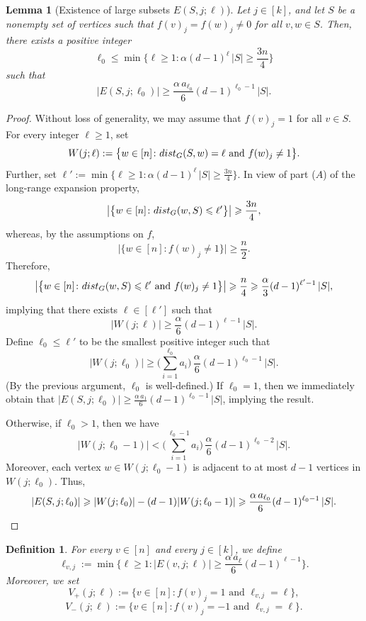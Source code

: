 \documentclass[11pt,leqno]{amsart}
\newtheorem{lemma}[theorem]{Lemma}
\newtheorem{definition}[theorem]{Definition}
\theoremstyle{remark}
\theoremstyle{plain}
\def\dist{{\rm dist}}
\def\dist{{\rm dist}}
\begin{document}
\begin{lemma}[Existence of large subsets $E(S,j;\ell)$]\label{afhbaofjhbojhb}
Let $j\in [k]$, and let $S$ be a nonempty set of vertices such that
$f(v)_j=f(w)_j\neq 0$ for all $v,w\in S$. Then, there exists a positive integer
$$\ell_0\leqslant \min\Big\{\ell\geqslant 1\colon \alpha(d-1)^\ell\,|S| \geqslant \frac{3n}{4}\Big\}$$
such that
$$ |E(S,j;\ell_0)|\geqslant \frac{\alpha\, a_{\ell_0}}{6}(d-1)^{\ell_0-1}\,|S|. $$
\end{lemma}
\begin{proof}
Without loss of generality, we may assume that $f(v)_j=1$ for all $v\in S$.
For every integer $\ell\geqslant 1$, set
$$ W(j;\ell):=\big\{ w\in [n]\colon \dist_G(S,w)= \ell \text{ and }  f(w)_j \neq 1 \big\}. $$
Further, set $\ell':=\min\big\{\ell\geqslant 1\colon \alpha(d-1)^\ell\,|S| \geqslant \frac{3n}{4}\big\}$.
In view of part (\hyperref[Part-A]{$A$}) of the long-range expansion property,
$$ \big|\big\{w\in[n]\colon \dist_G(w,S)\leqslant \ell'\big\}\big| \geqslant \frac{3n}{4}, $$
whereas, by the assumptions on $f$,
$$ \big|\big\{w\in[n]\colon f(w)_j\neq 1\big\}\big| \geqslant \frac{n}{2}. $$
Therefore,
$$ \big|\big\{w\in[n]\colon \dist_G(w,S)\leqslant \ell' \text{ and } f(w)_j \neq 1\big\}\big|
\geqslant \frac{n}{4}\geqslant \frac{\alpha}{3}(d-1)^{\ell'-1}\,|S|, $$
implying that there exists $\ell\in [\ell']$ such that
$$ |W(j;\ell)|\geqslant \frac{\alpha}{6}(d-1)^{\ell-1}\,|S|. $$
Define $\ell_0\leqslant \ell'$ to be the smallest positive integer such that
$$ |W(j;\ell_0)|\geqslant \Big(\sum_{i=1}^{\ell_0} a_i\Big)\, \frac{\alpha}{6}(d-1)^{\ell_0-1}\,|S|. $$
(By the previous argument, $\ell_0$ is well-defined.) If $\ell_0=1$, then we immediately obtain that
$|E(S,j;\ell_0)|\geqslant \frac{\alpha\,a_1}{6}(d-1)^{\ell_0-1}\,|S|$, implying the result.

Otherwise, if $\ell_0>1$, then we have
$$ |W(j;\ell_0-1)|< \Big(\sum_{i=1}^{\ell_0-1} a_i\Big)\, \frac{\alpha}{6}(d-1)^{\ell_0-2}\,|S|. $$
Moreover, each vertex $w\in W(j;\ell_0-1)$ is adjacent to at most $d-1$ vertices in $W(j;\ell_0)$. Thus,
\[ |E(S,j;\ell_0)|\geqslant |W(j;\ell_0)|-(d-1)|W(j;\ell_0-1)| \geqslant
\frac{\alpha\, a_{\ell_0}}{6}(d-1)^{\ell_0-1}\,|S|. \qedhere\]
\end{proof}

\begin{definition}
For every $v\in [n]$ and every $j\in [k]$, we define
$$ \ell_{v,j}:= \min\Big\{\ell\geqslant 1\colon |E(v,j;\ell)|\geqslant \frac{\alpha\,a_\ell}{6} (d-1)^{\ell-1}\Big\}. $$
Moreover, we set
$$ V_{+}(j;\ell):= \big\{v\in[n]\colon f(v)_j=1 \text{ and } \ell_{v,j}=\ell\big\}, $$ %
$$ V_{-}(j;\ell):= \big\{v\in[n]\colon f(v)_j=-1 \text{ and } \ell_{v,j}=\ell\big\}. $$
\end{definition}
\end{document}
